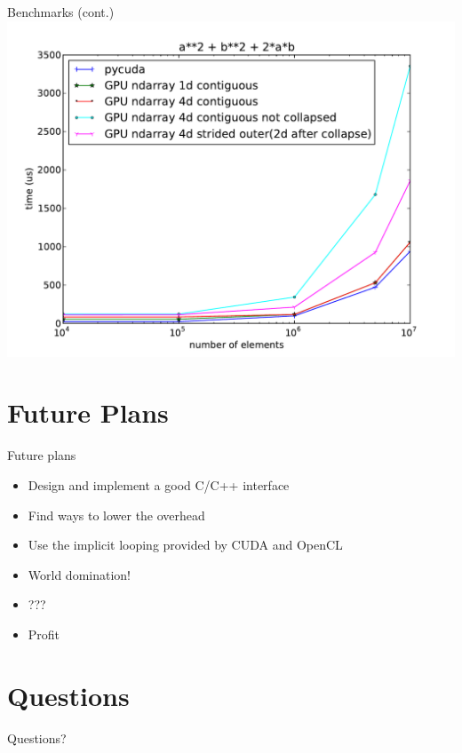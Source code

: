 \documentclass[utf8x,xcolor=pdftex,dvipsnames,table]{beamer}
\begin{document}
\begin{frame}{Benchmarks (cont.)}
\includegraphics[width=\textwidth]{a2pb2p2ab_no_alloc}
\end{frame}

\section{Future Plans}
\begin{frame}{Future plans}
\begin{itemize}
\item<1-> Design and implement a good C/C++ interface
\item<2-> Find ways to lower the overhead
\item<3-> Use the implicit looping provided by CUDA and OpenCL
\item<4-> World domination!
\item<5-> ???
\item<6-> Profit
\end{itemize}
\end{frame}

\section*{Questions}
\begin{frame}
\begin{center}
\Huge
Questions?
\end{center}
\end{frame}
\end{document}
